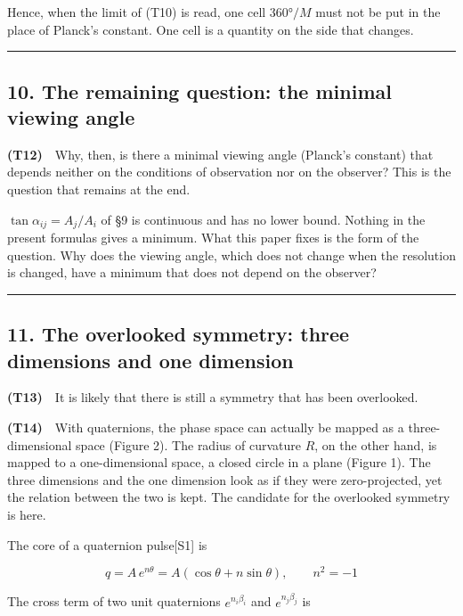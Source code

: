 \documentclass[
  a4paper,
]{article}
\begin{document}
Hence, when the limit of (T10) is read, one cell \(360°/M\) must not be
put in the place of Planck's constant. One cell is a quantity on the
side that changes.

\begin{center}\rule{0.5\linewidth}{0.5pt}\end{center}

\subsection{10. The remaining question: the minimal viewing
angle}\label{the-remaining-question-the-minimal-viewing-angle}

\textbf{(T12)}　Why, then, is there a minimal viewing angle (Planck's
constant) that depends neither on the conditions of observation nor on
the observer? This is the question that remains at the end.

\(\tan\alpha_{ij}=A_j/A_i\) of §9 is continuous and has no lower bound.
Nothing in the present formulas gives a minimum. What this paper fixes
is the form of the question. Why does the viewing angle, which does not
change when the resolution is changed, have a minimum that does not
depend on the observer?

\begin{center}\rule{0.5\linewidth}{0.5pt}\end{center}

\subsection{11. The overlooked symmetry: three dimensions and one
dimension}\label{the-overlooked-symmetry-three-dimensions-and-one-dimension}

\textbf{(T13)}　It is likely that there is still a symmetry that has
been overlooked.

\textbf{(T14)}　With quaternions, the phase space can actually be mapped
as a three-dimensional space (Figure 2). The radius of curvature \(R\),
on the other hand, is mapped to a one-dimensional space, a closed circle
in a plane (Figure 1). The three dimensions and the one dimension look
as if they were zero-projected, yet the relation between the two is
kept. The candidate for the overlooked symmetry is here.

The core of a quaternion pulse{[}S1{]} is

\[
q=A\,e^{n\theta}=A(\cos\theta+n\sin\theta),\qquad n^{2}=-1
\]

The cross term of two unit quaternions \(e^{n_i\beta_i}\) and
\(e^{n_j\beta_j}\) is
\end{document}
